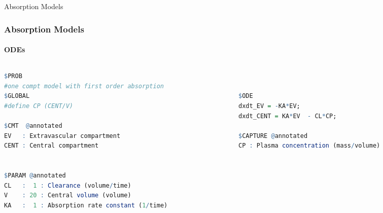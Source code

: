 \documentclass[
	11pt, %
]{beamer}
\begin{document}
\begin{frame}[fragile]{Absorption Models}
	\frametitle{Absorption Models}
	\framesubtitle{ODEs} %
    \begin{columns}[c] 
		\begin{column}{0.5\textwidth} %
		\tiny
\begin{lstlisting}[language=R]
$PROB
#one compt model with first order absorption
$GLOBAL
#define CP (CENT/V)

$CMT  @annotated
EV   : Extravascular compartment
CENT : Central compartment


$PARAM @annotated
CL   :  1 : Clearance (volume/time)
V    : 20 : Central volume (volume)
KA   :  1 : Absorption rate constant (1/time)

\end{lstlisting}

\end{column}
		\begin{column}{0.5\textwidth} %
\begin{lstlisting}[language=R]


$ODE
dxdt_EV = -KA*EV;
dxdt_CENT = KA*EV  - CL*CP;

$CAPTURE @annotated
CP : Plasma concentration (mass/volume)

	\end{lstlisting}
		\end{column}
	\end{columns}
	\end{frame}
\end{document}
